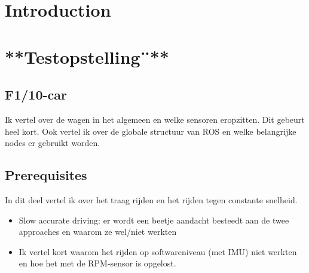 \documentclass[conference,a4paper]{IEEEtran}
\begin{document}

%
\IEEEpeerreviewmaketitle



\section{Introduction}


\section{**Testopstelling¨**}
\subsection{F1/10-car}
Ik vertel over de wagen in het algemeen en welke sensoren eropzitten. Dit gebeurt heel kort.
Ook vertel ik over de globale structuur van ROS en welke belangrijke nodes er gebruikt worden.

\subsection{Prerequisites}
In dit deel vertel ik over het traag rijden en het rijden tegen constante snelheid.
\begin{itemize}
\item Slow accurate driving: er wordt een beetje aandacht besteedt aan de twee approaches en waarom ze wel/niet werkten
\item Ik vertel kort waarom het rijden op softwareniveau (met IMU) niet werkten en hoe het met de RPM-sensor is opgelost.
\end{itemize}
\end{document}
